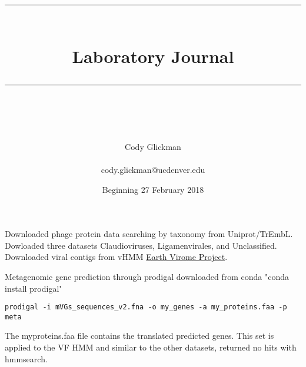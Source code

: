\documentclass[idxtotoc,hyperref,openany]{labbook} %
\newcommand{\HRule}{\rule{\linewidth}{0.5mm}} %
\begin{document}

\frontmatter %
\title{
\begin{center}
\HRule \\[0.4cm]
{\Huge \bfseries Laboratory Journal \\[0.5cm] \Large} %
\HRule \\[1.5cm]
\end{center}
}
\author{\Huge Cody Glickman \\ \\ \LARGE cody.glickman@ucdenver.edu \\[2cm]} %
\date{Beginning 27 February 2018} %
\maketitle

\tableofcontents

\mainmatter %





Downloaded phage protein data searching by taxonomy from Uniprot/TrEmbL. Dowloaded three datasets Claudioviruses, Ligamenvirales, and Unclassified. Downloaded viral contigs from vHMM \href{http://portal.nersc.gov/dna/microbial/prokpubs/EarthVirome_DP/}{Earth Virome Project}. 

Metagenomic gene prediction through prodigal downloaded from conda "conda install prodigal"

\begin{verbatim}
prodigal -i mVGs_sequences_v2.fna -o my_genes -a my_proteins.faa -p meta
\end{verbatim}

The myproteins.faa file contains the translated predicted genes. This set is applied to the VF HMM and similar to the other datasets, returned no hits with hmmsearch. 

\vspace{0.3cm}
\end{document}
